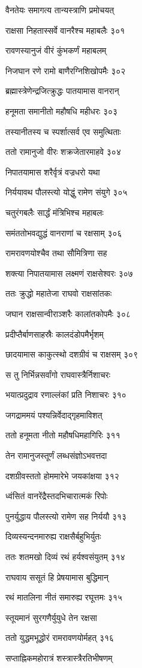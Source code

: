 वैनतेयः समागत्य तान्यस्त्राणि प्रमोचयत्

राक्षसा निहतास्सर्वे वानरैश्च महाबलैः ३०१

रावणस्यानुजं वीरं कुंभकर्णं महाबलम्

निजघान रणे रामो बाणैरग्निशिखोपमैः ३०२

ब्रह्मास्त्रेणेन्द्रजित्क्रुद्धः पातयामास वानरान्

हनूमता समानीतो महौषधि महीधरः ३०३

तस्यानीतस्य च स्पर्शात्सर्व एव समुत्थिताः

ततो रामानुजो वीरः शक्रजेतारमाहवे ३०४

निपातयामास शरैर्वृत्रं वज्रधरो यथा

निर्ययावथ पौलस्त्यो योद्धुं रामेण संयुगे ३०५

चतुरंगबलैः सार्द्धं मंत्रिभिश्च महाबलः

समंततोभवद्युद्धं वानराणां च रक्षसाम् ३०६

रामरावणयोश्चैव तथा सौमित्रिणा सह

शक्त्या निपातयामास लक्ष्मणं राक्षसेश्वरः ३०७

ततः क्रुद्धो महातेजा राघवो राक्षसांतकः

जघान राक्षसान्वीराञ्शरैः कालांतकोपमैः ३०८

प्रदीप्तैर्बाणसाहस्रैः कालदंडोपमैर्भृशम्

छादयामास काकुत्स्थो दशग्रीवं च राक्षसम् ३०९

स तु निर्भिन्नसर्वांगो राघवास्त्रैर्निशाचरः

भयात्प्रदुद्राव रणाल्लंकां प्रति निशाचरः ३१०

जगद्राममयं पश्यन्निर्वेदाद्गृहमाविशत्

ततो हनूमता नीतो महौषधिमहागिरिः ३११

तेन रामानुजस्तूर्णं लब्धसंज्ञोऽभवत्तदा

दशग्रीवस्ततो होममारेभे जयकांक्षया ३१२

ध्वंसितं वानरेंद्रैस्तदभिचारात्मकं रिपोः

पुनर्युद्धाय पौलस्त्यो रामेण सह निर्ययौ ३१३

दिव्यस्यन्दनमारुह्य राक्षसैर्बहुभिर्युतः

ततः शतमखो दिव्यं रथं हर्यश्वसंयुतम् ३१४

राघवाय ससूतं हि प्रेषयामास बुद्धिमान्

रथं मातलिना नीतं समारुह्य रघूत्तमः ३१५

स्तूयमानं सुरगणैर्युयुधे तेन रक्षसा

ततो युद्धमभूद्धोरं रामरावणयोर्महत् ३१६

सप्ताह्निकमहोरात्रं शस्त्रास्त्रैरतिभीषणम्


